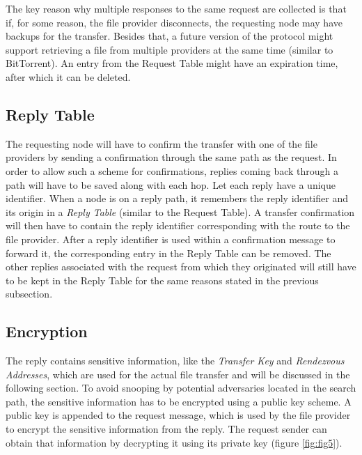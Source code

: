 The key reason why multiple responses to the same request are collected is that 
if, for some reason, the file provider disconnects, the requesting node may 
have backups for the transfer. Besides that, a future version of the protocol 
might support retrieving a file from multiple providers at the same time 
(similar to BitTorrent). An entry from the Request Table might have an 
expiration time, after which it can be deleted.

\subsection{Reply Table}

The requesting node will have to confirm the transfer with one of the file 
providers by sending a confirmation through the same path as the request. In 
order to allow such a scheme for confirmations, replies coming back through a 
path will have to be saved along with each hop. Let each reply have a unique 
identifier. When a node is on a reply path, it remembers the reply identifier 
and its origin in a \textit{Reply Table} (similar to the Request Table). A 
transfer confirmation will then have to contain the reply identifier 
corresponding with the route to the file provider. After a reply identifier is 
used within a confirmation message to forward it, the corresponding entry in 
the Reply Table can be removed. The other replies associated with the request 
from which they originated will still have to be kept in the Reply Table for 
the same reasons stated in the previous subsection.

\subsection{Encryption}

The reply contains sensitive information, like the \textit{Transfer Key} and 
\textit{Rendezvous Addresses}, which are used for the actual file transfer and 
will be discussed in the following section. To avoid snooping by potential 
adversaries located in the search path, the sensitive information has to be 
encrypted using a public key scheme. A public key is appended to the request 
message, which is used by the file provider to encrypt the sensitive 
information from the reply. The request sender can obtain that information by 
decrypting it using its private key (figure \ref{fig:fig5}).

